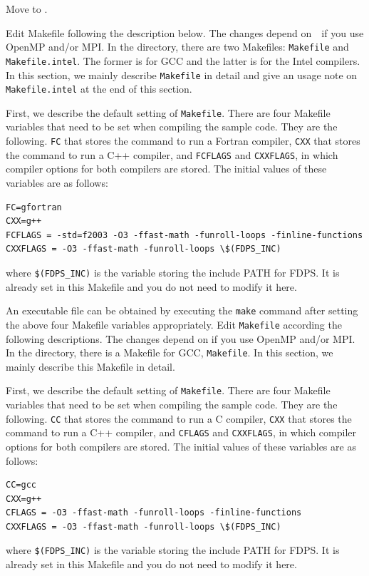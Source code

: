 Move to \dirNameNbodySample.

\label{s3sec:edit_Makefile_in_nbody}
\ifCpp %
Edit Makefile following the description below. The changes depend on　if you use OpenMP and/or MPI.
\endifCpp %
\ifFtn %
In the directory, there are two Makefiles: \texttt{Makefile} and \texttt{Makefile.intel}. The former is for GCC and the latter is for the Intel compilers. In this section, we mainly describe \texttt{Makefile} in detail and give an usage note on \texttt{Makefile.intel} at the end of this section.

First, we describe the default setting of \texttt{Makefile}. There are four Makefile variables that need to be set when compiling the sample code. They are the following. \texttt{FC} that stores the command to run a Fortran compiler, \texttt{CXX} that stores the command to run a C++ compiler, and \texttt{FCFLAGS} and \texttt{CXXFLAGS}, in which compiler options for both compilers are stored. The initial values of these variables are as follows:
\begin{screen}
\begin{Verbatim}[commandchars=\\\{\}]
FC=gfortran
CXX=g++
FCFLAGS = -std=f2003 -O3 -ffast-math -funroll-loops -finline-functions
CXXFLAGS = -O3 -ffast-math -funroll-loops \$(FDPS_INC)
\end{Verbatim}
\end{screen}
where \texttt{\$(FDPS\_INC)} is the variable storing the include PATH for FDPS. It is already set in this Makefile and you do not need to modify it here.

An executable file can be obtained by executing the \texttt{make} command after setting the above four Makefile variables appropriately. Edit \texttt{Makefile} according the following descriptions. The changes depend on if you use OpenMP and/or MPI.
\endifFtn %
\ifC %
In the directory, there is a Makefile for GCC, \texttt{Makefile}. In this section, we mainly describe this Makefile in detail.

First, we describe the default setting of \texttt{Makefile}. There are four Makefile variables that need to be set when compiling the sample code. They are the following. \texttt{CC} that stores the command to run a C compiler, \texttt{CXX} that stores the command to run a C++ compiler, and \texttt{CFLAGS} and \texttt{CXXFLAGS}, in which compiler options for both compilers are stored. The initial values of these variables are as follows:
\begin{screen}
\begin{Verbatim}[commandchars=\\\{\}]
CC=gcc
CXX=g++
CFLAGS = -O3 -ffast-math -funroll-loops -finline-functions
CXXFLAGS = -O3 -ffast-math -funroll-loops \$(FDPS_INC)
\end{Verbatim}
\end{screen}
where \texttt{\$(FDPS\_INC)} is the variable storing the include PATH for FDPS. It is already set in this Makefile and you do not need to modify it here.

